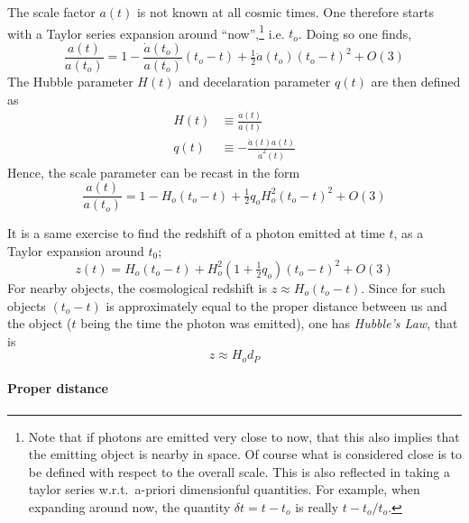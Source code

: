 \documentclass[10pt]{article}
\begin{document}
The scale factor $a(t)$ is not known at all cosmic times. One 
therefore starts with a Taylor series expansion around 
``now'',\footnote{Note that if photons are emitted very close to 
	now, that this also implies that the emitting object is nearby 
	in space.  Of course what is considered close is to be defined 
	with respect to the overall scale. This is also reflected in 
	taking a taylor series w.r.t.\ a-priori dimensionful 
	quantities. For example, when expanding around now, the 
	quantity $\delta t = t - t_o$ is really $t - t_o / t_o$.} i.e.  
$t_o$.  Doing so one finds,
%
\begin{displaymath}
	\frac{a(t)}{a(t_o)} = 1 - \frac{\dot{a}(t_o)}{a(t_o)}(t_o - t) 
	+ \tfrac{1}{2} \ddot{a}(t_o)(t_o -t)^2 + O(3)
\end{displaymath}
%
The Hubble parameter $H(t)$ and decelaration parameter $q(t)$ are 
then defined as
%
\begin{align}
	H(t) &\equiv \frac{\dot{a}(t)}{a(t)} \\
	q(t) &\equiv -\frac{\ddot{a}(t)a(t)}{\dot{a}^2(t)}
\end{align}
%
Hence, the scale parameter can be recast in the form
%
\begin{equation}
	\frac{a(t)}{a(t_o)} = 1 - H_o(t_o-t) + \tfrac{1}{2} q_o H^2_o 
	(t_o-t)^2 + O(3)
\end{equation}

It is a same exercise to find the redshift of a photon emitted at 
time $t$, as a Taylor expansion around $t_0$;
%
\begin{equation}
	z(t) = H_o(t_o-t) + H^2_o(1+\tfrac{1}{2}q_o) (t_o-t)^2 + O(3)
\end{equation}
%
For nearby objects, the cosmological redshift is $z \approx H_o 
(t_o-t)$. Since for such objects $(t_o-t)$ is approximately equal 
to the proper distance between us and the object ($t$ being the 
time the photon was emitted), one has \emph{Hubble's Law}, that 
is
%
\begin{equation}
	z \approx H_o d_P
\end{equation}

\paragraph{Proper distance}
\end{document}
